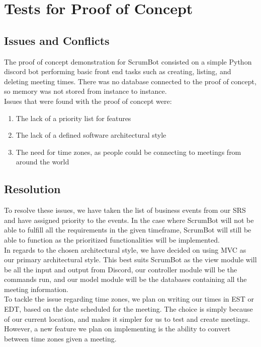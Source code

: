 \documentclass[12pt, titlepage]{article}
\begin{document}
\section{Tests for Proof of Concept}

\subsection{Issues and Conflicts}
The proof of concept demonstration for ScrumBot consisted on a simple Python discord bot performing basic front end tasks such as creating, listing, and deleting meeting times. There was no database connected to the proof of concept, so memory was not stored from instance to instance.\\
\noindent Issues that were found with the proof of concept were:
\begin{enumerate}
    \item The lack of a priority list for features
    \item The lack of a defined software architectural style
    \item The need for time zones, as people could be connecting to meetings from around the world
\end{enumerate}

\subsection{Resolution}
To resolve these issues, we have taken the list of business events from our SRS and have assigned priority to the events. In the case where ScrumBot will not be able to fulfill all the requirements in the given timeframe, ScrumBot will still be able to function as the prioritized functionalities will be implemented.\\
\noindent In regards to the chosen architectural style, we have decided on using MVC as our primary architectural style. This best suits ScrumBot as the view module will be all the input and output from Discord, our controller module will be the commands run, and our model module will be the databases containing all the meeting information.\\
\noindent To tackle the issue regarding time zones, we plan on writing our times in EST or EDT, based on the date scheduled for the meeting. The choice is simply because of our current location, and makes it simpler for us to test and create meetings. However, a new feature we plan on implementing is the ability to convert between time zones given a meeting.
	
\end{document}
